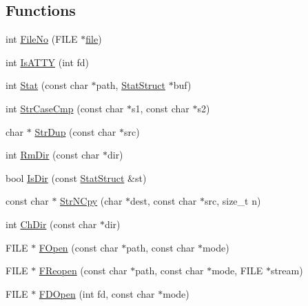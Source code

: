 \subsection*{Functions}
\begin{DoxyCompactItemize}
\item 
int \hyperlink{namespacetesting_1_1internal_1_1posix_a3117b067e1f942a2031e666953120ccc}{File\+No} (F\+I\+LE $\ast$\hyperlink{_07copy_08_2_read_camera_model_8m_a151631b2fd2bb776ef06c9f440a7ed74}{file})
\item 
int \hyperlink{namespacetesting_1_1internal_1_1posix_a16ebe936b3a8ea462a94191635aedc27}{Is\+A\+T\+TY} (int fd)
\item 
int \hyperlink{namespacetesting_1_1internal_1_1posix_a2b87b7ff647a128614daf50667eb9304}{Stat} (const char $\ast$path, \hyperlink{namespacetesting_1_1internal_1_1posix_a8eb9f08d3af29941c2d2a964cfff3ecb}{Stat\+Struct} $\ast$buf)
\item 
int \hyperlink{namespacetesting_1_1internal_1_1posix_a1ef2385a7f8e4c706054da35967e76bd}{Str\+Case\+Cmp} (const char $\ast$s1, const char $\ast$s2)
\item 
char $\ast$ \hyperlink{namespacetesting_1_1internal_1_1posix_a8e352884793a65ae8be144676f1a9136}{Str\+Dup} (const char $\ast$src)
\item 
int \hyperlink{namespacetesting_1_1internal_1_1posix_acbad5d4ea5b73fd1765f5f760642932a}{Rm\+Dir} (const char $\ast$dir)
\item 
bool \hyperlink{namespacetesting_1_1internal_1_1posix_af0d04ed5baeed28353fa38742748a421}{Is\+Dir} (const \hyperlink{namespacetesting_1_1internal_1_1posix_a8eb9f08d3af29941c2d2a964cfff3ecb}{Stat\+Struct} \&st)
\item 
const char $\ast$ \hyperlink{namespacetesting_1_1internal_1_1posix_a36fca815713332e5c6dc92c98b6b2574}{Str\+N\+Cpy} (char $\ast$dest, const char $\ast$src, size\+\_\+t n)
\item 
int \hyperlink{namespacetesting_1_1internal_1_1posix_a1ddc8a4fc6bb21da372307485591a212}{Ch\+Dir} (const char $\ast$dir)
\item 
F\+I\+LE $\ast$ \hyperlink{namespacetesting_1_1internal_1_1posix_a4042201dcc4932641d484e7ddf94de7d}{F\+Open} (const char $\ast$path, const char $\ast$mode)
\item 
F\+I\+LE $\ast$ \hyperlink{namespacetesting_1_1internal_1_1posix_a9ef6d089cdae03f9d9e0e6d379c40703}{F\+Reopen} (const char $\ast$path, const char $\ast$mode, F\+I\+LE $\ast$stream)
\item 
F\+I\+LE $\ast$ \hyperlink{namespacetesting_1_1internal_1_1posix_af7c268eba32d5a718b36b6b3801302e0}{F\+D\+Open} (int fd, const char $\ast$mode)

\end{DoxyCompactItemize}
